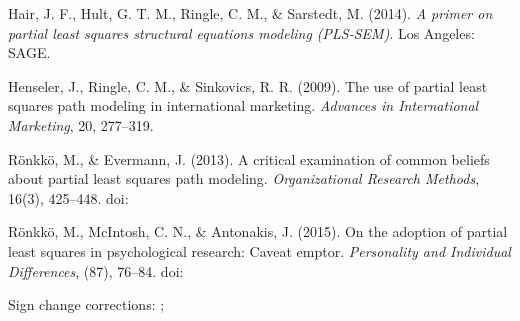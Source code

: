 \documentclass[a4paper]{book}
\begin{document}
\begin{References}\relax
Hair, J. F., Hult, G. T. M., Ringle, C. M., \& Sarstedt, M. (2014). 
\emph{A primer on partial least squares structural equations modeling (PLS-SEM)}.
Los Angeles: SAGE.

Henseler, J., Ringle, C. M., \& Sinkovics, R. R. (2009). The use of partial
least squares path modeling in international marketing.
\emph{Advances in International Marketing}, 20, 277–319.

Rönkkö, M., \& Evermann, J. (2013). A critical examination of common beliefs
about partial least squares path modeling. 
\emph{Organizational Research Methods}, 16(3), 425–448. 
doi:\nobreakspace{}

Rönkkö, M., McIntosh, C. N., \& Antonakis, J. (2015). On the adoption of
partial least squares in psychological research: Caveat emptor.
\emph{Personality and Individual Differences}, (87), 76–84.
doi:\nobreakspace{}
\end{References}
%
\begin{SeeAlso}\relax
{}

Sign change corrections: ; 
\end{SeeAlso}
%
\end{document}
